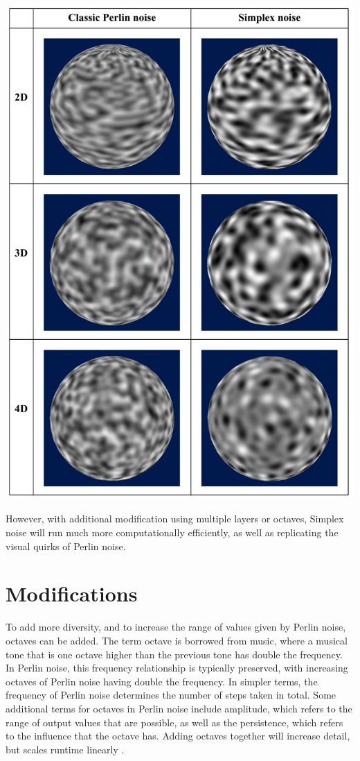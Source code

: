 \documentclass[10pt]{report}
\begin{document}
		\begin{minipage}{\textwidth}
			\centering
			\includegraphics[scale=.2]{perlin vs simplex}
			\label{fig:fig4}
		\end{minipage}
		
		However, with additional modification using multiple layers or octaves, Simplex noise will run much more computationally efficiently, as well as replicating the visual quirks of Perlin noise.
		
		\section{Modifications}
		To add more diversity, and to increase the range of values given by Perlin noise, octaves can be added. The term octave is borrowed from music, where a musical tone that is one octave higher than the previous tone has double the frequency. In Perlin noise, this frequency relationship is typically preserved, with increasing octaves of Perlin noise having double the frequency. In simpler terms, the frequency of Perlin noise determines the number of steps taken in total. Some additional terms for octaves in Perlin noise include amplitude, which refers to the range of output values that are possible, as well as the persistence, which refers to the influence that the octave has. Adding octaves together will increase detail, but scales runtime linearly \cite{pn-under}. 
		
\end{document}
